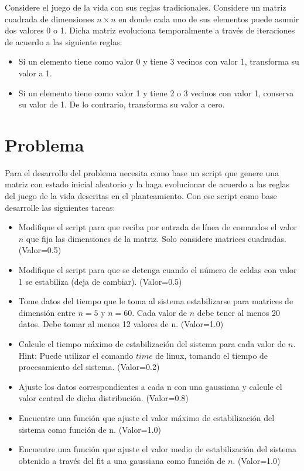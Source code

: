 \documentclass[10.5pt]{article}
\begin{document}
Considere el juego de la vida con sus reglas tradicionales. Considere un matriz cuadrada de dimensiones $n \times n$ en donde cada uno de sus elementos puede asumir dos valores 0 o 1. Dicha matriz evoluciona temporalmente a trav\'{e}s de iteraciones de acuerdo a las siguiente reglas:

\begin{itemize}
\item Si un elemento tiene como valor 0 y tiene 3 vecinos con valor 1, transforma su valor a 1.
\item Si un elemento tiene como valor 1 y tiene 2 o 3 vecinos con valor 1, conserva su valor de 1. De lo contrario, transforma su valor a cero.
\end{itemize}

\section{Problema}

Para el desarrollo del problema necesita como base un script que genere una matriz con estado inicial aleatorio y la haga evolucionar de acuerdo a las reglas del juego de la vida descritas en el planteamiento. Con ese script como base desarrolle las siguientes tareas:

\begin{itemize}
\item Modifique el script para que reciba por entrada de l\'{i}nea de comandos el valor $n$ que fija las dimensiones de la matriz. Solo considere matrices cuadradas. (Valor=0.5)
\item Modifique el script para que se detenga cuando el n\'{u}mero de celdas con valor 1 se estabiliza (deja de cambiar). (Valor=0.5)
\item Tome datos del tiempo que le toma al sistema estabilizarse para matrices de dimensi\'{o}n entre $n=5$ y $n=60$. Cada valor de $n$ debe tener al menos 20 datos. Debe tomar al menos 12 valores de n. (Valor=1.0)
\item Calcule el tiempo m\'{a}ximo de estabilizaci\'{o}n del sistema para cada valor de $n$. Hint: Puede utilizar el comando $time$ de linux, tomando el tiempo de procesamiento del sistema. (Valor=0.2)
\item Ajuste los datos correspondientes a cada n con una gaussiana y calcule el valor central de dicha distribuci\'{o}n. (Valor=0.8)
\item Encuentre una funci\'{o}n que ajuste el valor m\'{a}ximo de estabilizaci\'{o}n del sistema como funci\'{o}n de n. (Valor=1.0)
\item Encuentre una funci\'{o}n que ajuste el valor medio de estabilizaci\'{o}n del sistema obtenido a trav\'{e}s del fit a una gaussiana como funci\'{o}n de $n$. (Valor=1.0)
\end{itemize}
\end{document}
